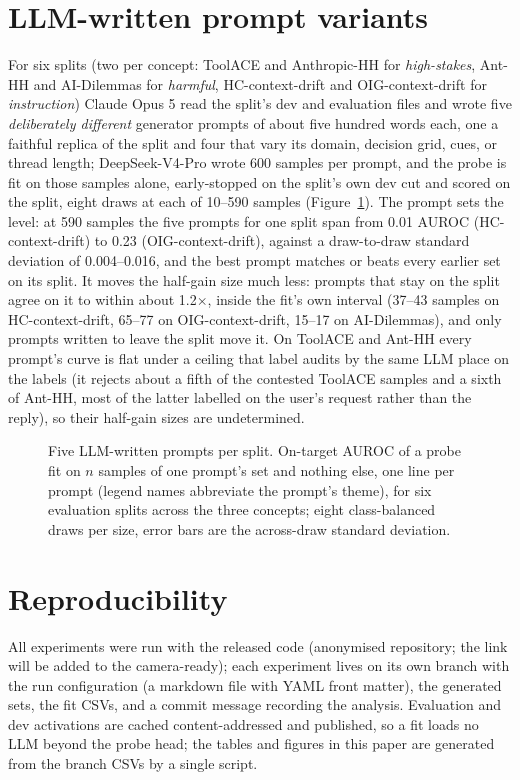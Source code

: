 \documentclass{article} %
\newcommand{\hs}{\emph{high-stakes}}
\newcommand{\harm}{\emph{harmful}}
\newcommand{\instr}{\emph{instruction}}
\begin{document}
\section{LLM-written prompt variants}
\label{app:llmprompts}
For six splits (two per concept: ToolACE and Anthropic-HH for \hs{}, Ant-HH and AI-Dilemmas for \harm{}, HC-context-drift and OIG-context-drift for \instr{}) Claude Opus 5 read the split's dev and evaluation files and wrote five \emph{deliberately different} generator prompts of about five hundred words each, one a faithful replica of the split and four that vary its domain, decision grid, cues, or thread length; DeepSeek-V4-Pro wrote 600 samples per prompt, and the probe is fit on those samples alone, early-stopped on the split's own dev cut and scored on the split, eight draws at each of 10--590 samples (Figure~\ref{fig:prompt_variants}). The prompt sets the level: at 590 samples the five prompts for one split span from 0.01 AUROC (HC-context-drift) to 0.23 (OIG-context-drift), against a draw-to-draw standard deviation of 0.004--0.016, and the best prompt matches or beats every earlier set on its split. It moves the half-gain size much less: prompts that stay on the split agree on it to within about 1.2$\times$, inside the fit's own interval (37--43 samples on HC-context-drift, 65--77 on OIG-context-drift, 15--17 on AI-Dilemmas), and only prompts written to leave the split move it. On ToolACE and Ant-HH every prompt's curve is flat under a ceiling that label audits by the same LLM place on the labels (it rejects about a fifth of the contested ToolACE samples and a sixth of Ant-HH, most of the latter labelled on the user's request rather than the reply), so their half-gain sizes are undetermined.

\begin{figure}[H]
  \centering
  
  \caption{Five LLM-written prompts per split. On-target AUROC of a probe fit on $n$ samples of one prompt's set and nothing else, one line per prompt (legend names abbreviate the prompt's theme), for six evaluation splits across the three concepts; eight class-balanced draws per size, error bars are the across-draw standard deviation.}
  \label{fig:prompt_variants}
\end{figure}

\section{Reproducibility}
All experiments were run with the released code (anonymised repository; the link will be added to the camera-ready); each experiment lives on its own branch with the run configuration (a markdown file with YAML front matter), the generated sets, the fit CSVs, and a commit message recording the analysis. Evaluation and dev activations are cached content-addressed and published, so a fit loads no LLM beyond the probe head; the tables and figures in this paper are generated from the branch CSVs by a single script.
\end{document}
